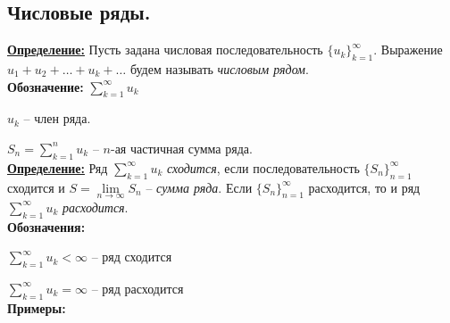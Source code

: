 \documentclass[a4paper,12pt]{article} %
\newcommand{\useries}{\sum\limits_{k=1}^{\infty} u_k}
\newcommand{\useriesl}{\sum\limits_{k=1}^{\infty} u_k < \infty}
\newcommand{\useriese}{\sum\limits_{k=1}^{\infty} u_k = \infty}
\newcommand{\sn}{\sum\limits_{k=1}^{n} u_k}
\begin{document}
\subsection{Числовые ряды.}

\underline{\textbf{Определение:}}
Пусть задана числовая последовательность $\{{u_k}\}_{k=1}^{\infty}$. Выражение $u_1 + u_2 + \ldots + u_k + \ldots$ будем называть \textit{числовым рядом}.\\

\textbf{Обозначение:} $\useries$

$u_k$ -- член ряда.

$S_n = \sn$ -- $n$-ая частичная сумма ряда.\\

\underline{\textbf{Определение:}}
Ряд $\useries$ \textit{сходится}, если последовательность $\{{S_n}\}_{n=1}^{\infty}$ сходится и $S = \lim\limits_{n \to \infty} S_n$ -- \textit{сумма ряда}. Если $\{{S_n}\}_{n=1}^{\infty}$ расходится, то и ряд $\useries$ \textit{расходится}.\\

\textbf{Обозначения:}

$\useriesl$ -- ряд сходится

$\useriese$ -- ряд расходится\\

\textbf{Примеры:}
\end{document}
